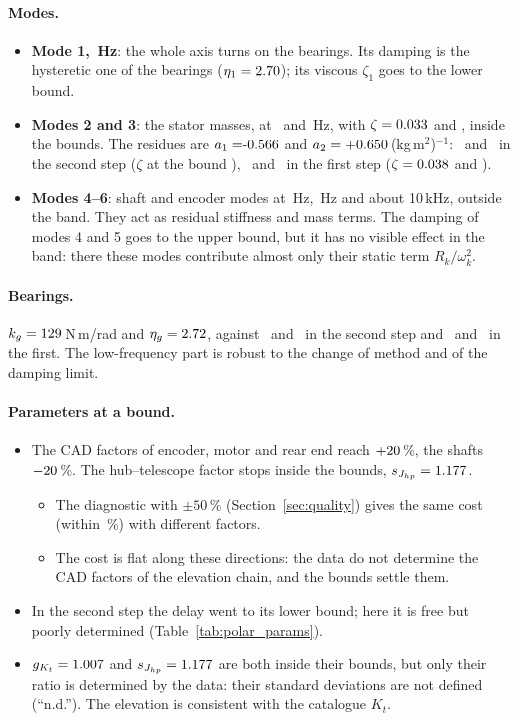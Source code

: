 \documentclass[10pt,a4paper]{article}
\numberwithin{equation}{section}
\begin{document}
\paragraph{Modes.}
\begin{itemize}
\item \textbf{Mode 1, \fBearP\,Hz}: the whole axis turns on the bearings. Its damping is the hysteretic one of the bearings ($\eta_1=2.70$); its viscous $\zeta_1$ goes to the lower bound.
\item \textbf{Modes 2 and 3}: the stator masses, at \fMassI\ and \fMassII\,Hz, with $\zeta=0.033$ and \zMassII, inside the bounds. The residues are $a_1=\aMassI$ and $a_2=+0.650$\,(kg\,m$^2$)$^{-1}$: \aStepI\ and \aStepII\ in the second step ($\zeta$ at the bound \zetaMaxStep), \aLogI\ and \aLogII\ in the first step ($\zeta=0.038$ and \zLogII).
\item \textbf{Modes 4--6}: shaft and encoder modes at \fShaftP\,Hz, \fShaftPb\,Hz and about 10\,kHz, outside the band. They act as residual stiffness and mass terms. The damping of modes 4 and 5 goes to the upper bound, but it has no visible effect in the band: there these modes contribute almost only their static term $R_k/\omega_k^2$.
\end{itemize}

\paragraph{Bearings.} $k_g=129$\,N\,m/rad and $\eta_g=2.72$, against \kgStep\ and \etagStep\ in the second step and \kgPrev\ and \etagPrev\ in the first. The low-frequency part is robust to the change of method and of the damping limit.

\paragraph{Parameters at a bound.}
\begin{itemize}
\item The CAD factors of encoder, motor and rear end reach $+20$\,\%, the shafts $-20$\,\%. The hub--telescope factor stops inside the bounds, $s_{J_{hp}}=1.177$.
  \begin{itemize}
  \item The diagnostic with $\pm50$\,\% (Section~\ref{sec:quality}) gives the same cost (within \cadCostP\,\%) with different factors.
  \item The cost is flat along these directions: the data do not determine the CAD factors of the elevation chain, and the bounds settle them.
  \end{itemize}
\item In the second step the delay went to its lower bound; here it is free but poorly determined (Table~\ref{tab:polar_params}).
\item $g_{K_t}=1.007$ and $s_{J_{hp}}=1.177$ are both inside their bounds, but only their ratio is determined by the data: their standard deviations are not defined (``n.d.''). The elevation is consistent with the catalogue $K_t$.
\end{itemize}
\end{document}
